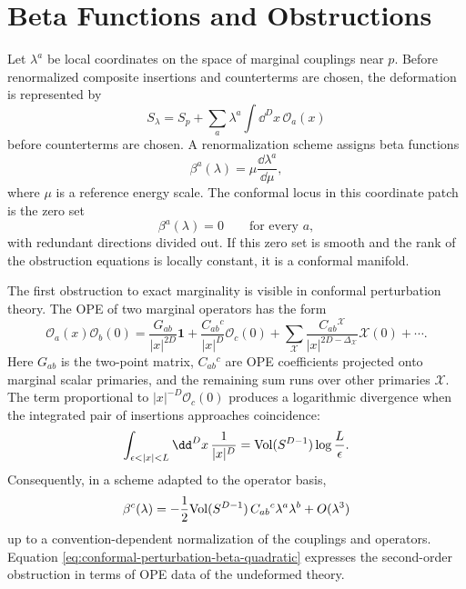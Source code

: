 \section{Beta Functions and Obstructions}

Let \(\lambda^a\) be local coordinates on the space of marginal couplings near
\(p\).  Before renormalized composite insertions and counterterms are chosen,
the deformation is represented by
\begin{equation}
  S_\lambda
  =
  S_p+\sum_a\lambda^a\int\dd^Dx\,\mathcal O_a(x)
  \label{eq:local-marginal-family-action}
\end{equation}
before counterterms are chosen.  A renormalization scheme assigns beta
functions
\[
  \beta^a(\lambda)=\mu\frac{\dd\lambda^a}{\dd\mu},
\]
where \(\mu\) is a reference energy scale.  The conformal locus in this
coordinate patch is the zero set
\[
  \beta^a(\lambda)=0
  \qquad
  \text{for every }a,
\]
with redundant directions divided out.  If this zero set is smooth and the
rank of the obstruction equations is locally constant, it is a conformal
manifold.

The first obstruction to exact marginality is visible in conformal
perturbation theory.  The OPE of two marginal operators has the form
\begin{equation}
  \mathcal O_a(x)\mathcal O_b(0)
  =
  \frac{G_{ab}}{|x|^{2D}}\mathbf 1
  +
  \frac{C_{ab}{}^c}{|x|^D}\mathcal O_c(0)
  +\sum_{\mathcal X}
    \frac{C_{ab}{}^{\mathcal X}}
         {|x|^{2D-\Delta_{\mathcal X}}}\mathcal X(0)
  +\cdots .
  \label{eq:marginal-operator-ope}
\end{equation}
Here \(G_{ab}\) is the two-point matrix, \(C_{ab}{}^c\) are OPE coefficients
projected onto marginal scalar primaries, and the remaining sum runs over
other primaries \(\mathcal X\).  The term proportional to
\(|x|^{-D}\mathcal O_c(0)\) produces a logarithmic divergence when the
integrated pair of insertions approaches coincidence:
\[
  \int_{\epsilon<|x|<L}\dd^Dx\,\frac1{|x|^D}
  =
  {\rm Vol}(S^{D-1})\log\frac L\epsilon .
\]
Consequently, in a scheme adapted to the operator basis,
\begin{equation}
  \beta^c(\lambda)
  =
  -\frac12{\rm Vol}(S^{D-1})\,C_{ab}{}^c\lambda^a\lambda^b
  +O(\lambda^3)
  \label{eq:conformal-perturbation-beta-quadratic}
\end{equation}
up to a convention-dependent normalization of the couplings and operators.
Equation \eqref{eq:conformal-perturbation-beta-quadratic} expresses the
second-order obstruction in terms of OPE data of the undeformed theory.

